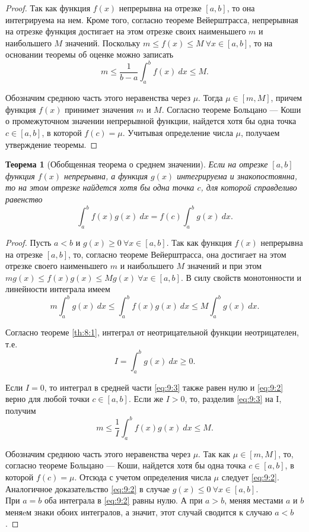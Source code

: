 \documentclass[12pt]{article}
\numberwithin{equation}{section}
\newtheorem{theorem}{Теорема}[section]
\begin{document}
\begin{proof}
Так как функция $f(x)$ непрерывна на отрезке $[a,b]$, то она интегрируема на нем. Кроме того, согласно теореме Вейерштрасса, непрерывная на отрезке функция достигает на этом отрезке своих наименьшего $m$ и наибольшего $M$ значений. Поскольку $m \leqslant f(x) \leqslant M~\forall x \in [a,b]$, то на основании теоремы об оценке можно записать 
\[ m \leqslant \frac{1}{b-a} \int_a^b f(x)~dx \leqslant M.\]

Обозначим среднюю часть этого неравенства через $\mu$. Тогда $\mu \in [m, M]$, причем функция $f(x)$ принимет значения $m$ и $M$.  Согласно теореме Больцано --- Коши о промежуточном значении непрерывной функции, найдется хотя бы одна точка $c \in [a,b]$, в которой $f(c) = \mu$. Учитывая определение числа $\mu$, получаем утверждение теоремы.
\end{proof}
\begin{theorem} [Обобщенная теорема о среднем значении]
Если на отрезке $[a,b]$ функция $f(x)$ непрерывна, а функция $g(x)$ интегрируема и знакопостоянна, то на этом отрезке найдется хотя бы одна точка $c$, для которой справделиво равенство
\begin{equation} \label{eq:9:2}
\int_a^b f(x) g(x)~dx = f(c) \int_a^b g(x)~dx.
\end{equation}
\end{theorem}
\begin{proof}
Пусть $a < b$ и $g(x) \geqslant 0~\forall x \in [a,b]$. Так как функция $f(x)$ непрерывна на отрезке $[a,b]$, то, согласно теореме Вейерштрасса, она достигает на этом отрезке своего наименьшего $m$ и наибольшего $M$ значений и при этом $m g(x) \leqslant f(x)g(x) \leqslant Mg(x)~\forall x \in [a,b]$. В силу свойств монотонности и линейности интеграла имеем
\begin{equation} \label{eq:9:3}
m \int_a^b g(x)~dx \leqslant \int_a^b f(x) g(x) ~dx \leqslant M \int_a^b g(x)~dx.
\end{equation}

Согласно теореме \ref{th:8:1}, интеграл от неотрицательной функции неотрицателен, т.е.
\[ I = \int_a^b g(x)~dx \geqslant 0.\]

Если $I = 0$, то интеграл в средней части \eqref{eq:9:3} также равен нулю и \eqref{eq:9:2} верно для любой точки $c \in [a,b]$. Если же $I > 0$, то, разделив \eqref{eq:9:3} на I, получим
\[ m \leqslant \frac{1}{I} \int_a^b f(x) g(x) ~dx \leqslant M.\]

Обозначим среднюю часть этого неравенства через $\mu$. Так как $\mu \in [m, M]$, то, согласно теореме Больцано --- Коши, найдется хотя бы одна точка $c \in [a,b]$, в которой  $f(c) = \mu$. Отсюда с учетом определения числа $\mu$ следует \eqref{eq:9:2}.\\

Аналогичное доказательство \eqref{eq:9:2} в случае $g(x) \leqslant 0~\forall x \in [a,b]$.\\

При $a = b$ оба интеграла в \eqref{eq:9:2} равны нулю. А при $a > b$, меняя местами $a$ и $b$ меняeм знаки обоих интегралов, а значит, этот случай сводится к случаю $a < b$.
\end{proof}
\end{document}
